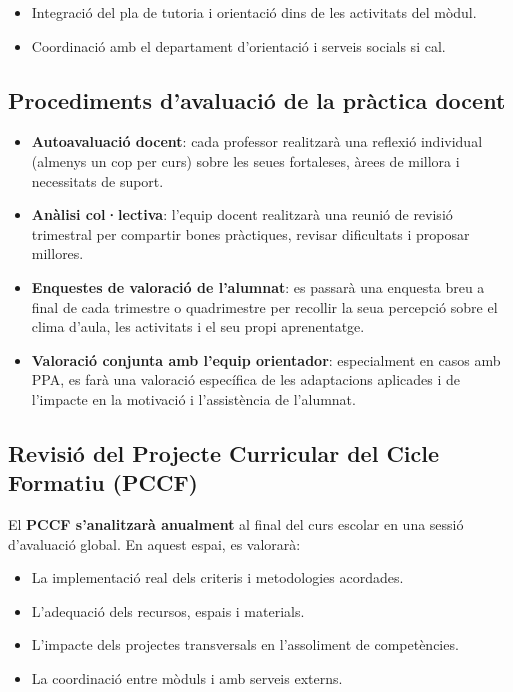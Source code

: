 \documentclass[
  paper=a4,
  ,captions=tableheading
]{scrartcl}
\providecommand{\tightlist}{%
  \setlength{\itemsep}{0pt}\setlength{\parskip}{0pt}}
\begin{document}
\begin{enumerate}
  \begin{itemize}
  \tightlist
  \item
    Integració del pla de tutoria i orientació dins de les activitats
    del mòdul.
  \item
    Coordinació amb el departament d'orientació i serveis socials si
    cal.
  \end{itemize}
\end{enumerate}

\hypertarget{procediments-davaluaciuxf3-de-la-pruxe0ctica-docent}{%
\subsection{Procediments d'avaluació de la pràctica
docent}\label{procediments-davaluaciuxf3-de-la-pruxe0ctica-docent}}

\begin{itemize}
\item
  \textbf{Autoavaluació docent}: cada professor realitzarà una reflexió
  individual (almenys un cop per curs) sobre les seues fortaleses, àrees
  de millora i necessitats de suport.
\item
  \textbf{Anàlisi col·lectiva}: l'equip docent realitzarà una reunió de
  revisió trimestral per compartir bones pràctiques, revisar dificultats
  i proposar millores.
\item
  \textbf{Enquestes de valoració de l'alumnat}: es passarà una enquesta
  breu a final de cada trimestre o quadrimestre per recollir la seua
  percepció sobre el clima d'aula, les activitats i el seu propi
  aprenentatge.
\item
  \textbf{Valoració conjunta amb l'equip orientador}: especialment en
  casos amb PPA, es farà una valoració específica de les adaptacions
  aplicades i de l'impacte en la motivació i l'assistència de l'alumnat.
\end{itemize}

\hypertarget{revisiuxf3-del-projecte-curricular-del-cicle-formatiu-pccf}{%
\subsection{Revisió del Projecte Curricular del Cicle Formatiu
(PCCF)}\label{revisiuxf3-del-projecte-curricular-del-cicle-formatiu-pccf}}

El \textbf{PCCF s'analitzarà anualment} al final del curs escolar en una
sessió d'avaluació global. En aquest espai, es valorarà:

\begin{itemize}
\tightlist
\item
  La implementació real dels criteris i metodologies acordades.
\item
  L'adequació dels recursos, espais i materials.
\item
  L'impacte dels projectes transversals en l'assoliment de competències.
\item
  La coordinació entre mòduls i amb serveis externs.
\end{itemize}
\end{document}
